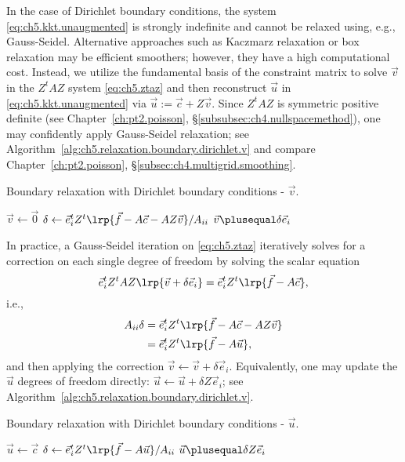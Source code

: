 In the case of Dirichlet boundary conditions, the system \eqref{eq:ch5.kkt.unaugmented} is strongly indefinite and cannot be relaxed using, e.g., Gauss-Seidel. Alternative approaches such as Kaczmarz relaxation or box relaxation may be efficient smoothers; however, they have a high computational cost. Instead, we utilize the fundamental basis of the constraint matrix to solve $\vec{v}$ in the $Z^tAZ$ system \eqref{eq:ch5.ztaz} and then reconstruct $\vec{u}$ in \eqref{eq:ch5.kkt.unaugmented} via $\vec{u} := \vec{c} + Z \vec{v}$. Since $Z^tAZ$ is symmetric positive definite (see Chapter~\ref{ch:pt2.poisson}, \S\ref{subsubsec:ch4.nullspacemethod}), one may confidently apply Gauss-Seidel relaxation; see Algorithm~\ref{alg:ch5.relaxation.boundary.dirichlet.v} and compare Chapter~\ref{ch:pt2.poisson}, \S\ref{subsec:ch4.multigrid.smoothing}.

\begin{algorithm}[htbp]
\caption{Boundary relaxation with Dirichlet boundary conditions - $\vec{v}$.}
\label{alg:ch5.relaxation.boundary.dirichlet.v}
\begin{algorithmic}[1]
\STATE $\vec{v} \leftarrow \vec{0}$
    \STATE $\delta \leftarrow \vec{e}_i^t Z^t \lrp{\vec{f} - A \vec{c} - AZ \vec{v}} / A_{ii}$
    \STATE $\vec{v} \plusequal \delta \vec{e}_i$
\ENDFOR
\end{algorithmic}
\end{algorithm}

In practice, a Gauss-Seidel iteration on \eqref{eq:ch5.ztaz} iteratively solves for a correction on each single degree of freedom by solving the scalar equation
\begin{equation*}
\vec{e}_i^t Z^tAZ \lrp{\vec{v} + \delta \vec{e}_i} = \vec{e}_i^t Z^t \lrp{\vec{f} - A \vec{c}},
\end{equation*}
i.e.,
\begin{align*}
A_{ii} \delta & = \vec{e}_i^t Z^t \lrp{\vec{f} - A \vec{c} - A Z \vec{v}} \\
              & = \vec{e}_i^t Z^t \lrp{\vec{f} - A \vec{u}},
\end{align*}
and then applying the correction $\vec{v} \leftarrow \vec{v} + \delta \vec{e}_i$. Equivalently, one may update the $\vec{u}$ degrees of freedom directly: $\vec{u} \leftarrow \vec{u} + \delta Z \vec{e}_i$; see Algorithm~\ref{alg:ch5.relaxation.boundary.dirichlet.v}.

\begin{algorithm}[htbp]
\caption{Boundary relaxation with Dirichlet boundary conditions - $\vec{u}$.}
\label{alg:ch5.relaxation.boundary.dirichlet.v}
\begin{algorithmic}[1]
\STATE $\vec{u} \leftarrow \vec{c}$
    \STATE $\delta \leftarrow \vec{e}_i^t Z^t \lrp{\vec{f} - A \vec{u}} / A_{ii}$
    \STATE $\vec{u} \plusequal \delta Z \vec{e}_i$
\ENDFOR
\end{algorithmic}
\end{algorithm}

